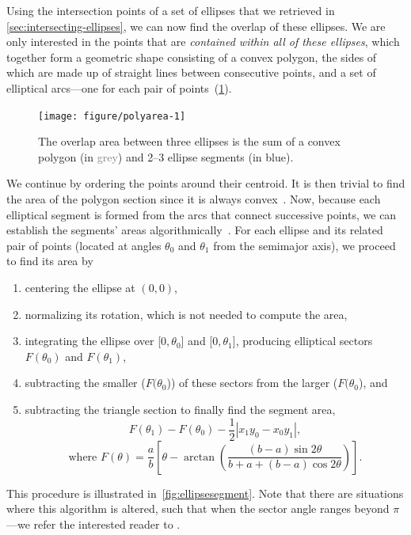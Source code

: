 \documentclass[
  oneside,
  openany,
  numbers=noendperiod,
  parskip=half,
  bibliography=totoc
]{scrbook}\usepackage[]{graphicx}\usepackage{xcolor}
\newenvironment{knitrout}{}{} %
\begin{document}
Using the intersection points of a set of ellipses that we retrieved in
\cref{sec:intersecting-ellipses}, we can now find the
overlap of these ellipses. We are only interested in the points that are \emph{contained
within all of these ellipses}, which together form a geometric shape consisting of a
convex polygon, the sides of which are made up of straight lines between
consecutive points, and a set of elliptical arcs---one for each
pair of points~(\cref{fig:polyarea}).

\begin{figure}[hbtp]
\caption{The overlap area between three ellipses is the sum of a convex
polygon (in \textcolor{Grey}{grey}) and 2--3 ellipse segments (in
\textcolor{SteelBlue4}{blue}).\label{fig:polyarea}}
\begin{knitrout}\small
{}\color{fgcolor}

{\centering \texttt{[image: figure/polyarea-1]} 

}



\end{knitrout}
\end{figure}

We continue by ordering the points around their centroid. It is then trivial to
find the area of the
polygon section since it is always convex~\citep{Finley_2006}. Now, because each
elliptical segment is formed from the arcs that connect successive
points, we can establish the segments' areas algorithmically~\citep{Eberly_2016}.
For each ellipse and its related pair of points (located at angles $\theta_0$ and
$\theta_1$ from the semimajor axis), we proceed to find its area by
\begin{enumerate}
\item centering the ellipse at $(0, 0)$,
\item normalizing its rotation, which is not needed to compute the area,
\item integrating the ellipse over [$0,\theta_0$] and [$0,\theta_1$], producing
  elliptical sectors $F(\theta_0)$ and $F(\theta_1)$,
\item subtracting the smaller ($F(\theta_0$)) of these sectors from the larger ($F(\theta_0$), and
\item subtracting the triangle section to finally find the segment area,
  \begin{equation*}
  F(\theta_1) - F(\theta_0) - \frac{1}{2}\left|x_1y_0 - x_0y_1\right|,
  \label{eq:segmentArea}
  \end{equation*}
  \[
  \text{where } F(\theta) = \frac{a}{b}\left[ \theta - \arctan{\left(\frac{(b - a)\sin{2\theta}}{b + a +(b - a )\cos{2\theta}} \right)}\right].
  \]
\end{enumerate}
This procedure is illustrated in~\cref{fig:ellipsesegment}. Note that there are
situations where this algorithm is altered, such that when the sector angle
ranges beyond $\pi$---we refer the interested reader to \citet{Eberly_2016}.
\end{document}
